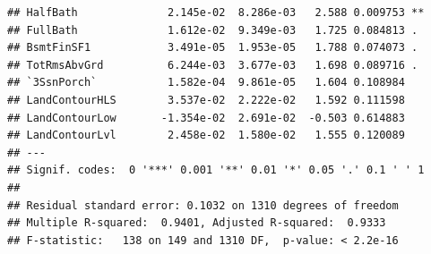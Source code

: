 \documentclass[american,]{article}
\theoremstyle{definition}
\theoremstyle{definition}
\theoremstyle{definition}
\theoremstyle{remark}
\begin{document}
\begin{verbatim}
## HalfBath              2.145e-02  8.286e-03   2.588 0.009753 ** 
## FullBath              1.612e-02  9.349e-03   1.725 0.084813 .  
## BsmtFinSF1            3.491e-05  1.953e-05   1.788 0.074073 .  
## TotRmsAbvGrd          6.244e-03  3.677e-03   1.698 0.089716 .  
## `3SsnPorch`           1.582e-04  9.861e-05   1.604 0.108984    
## LandContourHLS        3.537e-02  2.222e-02   1.592 0.111598    
## LandContourLow       -1.354e-02  2.691e-02  -0.503 0.614883    
## LandContourLvl        2.458e-02  1.580e-02   1.555 0.120089    
## ---
## Signif. codes:  0 '***' 0.001 '**' 0.01 '*' 0.05 '.' 0.1 ' ' 1
## 
## Residual standard error: 0.1032 on 1310 degrees of freedom
## Multiple R-squared:  0.9401, Adjusted R-squared:  0.9333 
## F-statistic:   138 on 149 and 1310 DF,  p-value: < 2.2e-16
\end{verbatim}
\end{document}
